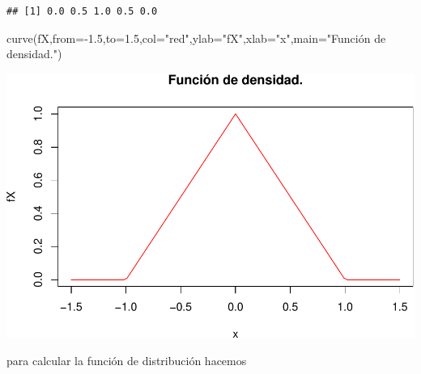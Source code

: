 \documentclass[
]{article}
\newenvironment{Shaded}{\begin{snugshade}}{\end{snugshade}}
\newcommand{\AttributeTok}[1]{\textcolor[rgb]{0.77,0.63,0.00}{#1}}
\newcommand{\FloatTok}[1]{\textcolor[rgb]{0.00,0.00,0.81}{#1}}
\newcommand{\FunctionTok}[1]{\textcolor[rgb]{0.00,0.00,0.00}{#1}}
\newcommand{\NormalTok}[1]{#1}
\newcommand{\SpecialCharTok}[1]{\textcolor[rgb]{0.00,0.00,0.00}{#1}}
\newcommand{\StringTok}[1]{\textcolor[rgb]{0.31,0.60,0.02}{#1}}
\begin{document}
\begin{verbatim}
## [1] 0.0 0.5 1.0 0.5 0.0
\end{verbatim}

\begin{Shaded}
\begin{Highlighting}[]
\FunctionTok{curve}\NormalTok{(fX,}\AttributeTok{from=}\SpecialCharTok{{-}}\FloatTok{1.5}\NormalTok{,}\AttributeTok{to=}\FloatTok{1.5}\NormalTok{,}\AttributeTok{col=}\StringTok{"red"}\NormalTok{,}\AttributeTok{ylab=}\StringTok{"fX"}\NormalTok{,}\AttributeTok{xlab=}\StringTok{"x"}\NormalTok{,}\AttributeTok{main=}\StringTok{"Función de densidad."}\NormalTok{)}
\end{Highlighting}
\end{Shaded}

\includegraphics{Tema-2---Variables-Aleatorias_parte2_continuas_Soluciones_files/figure-latex/unnamed-chunk-2-1.pdf}

para calcular la función de distribución hacemos
\end{document}
